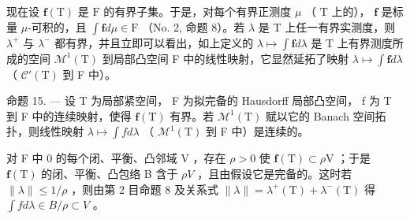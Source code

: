 现在设 \(\mathbf{f}(\mathrm{T})\) 是 \(\mathrm{F}\) 的有界子集。于是，对每个有界正测度 \(\mu\) （ \(\mathrm{T}\) 上的）， \(\mathbf{f}\) 是标量 \(\mu\)-可积的，且 \(\int \mathbf{f}d\mu \in \mathrm{F}\) （No. 2, 命题 8）。若 \(\lambda\) 是 T 上任一有界实测度，则 \(\lambda^{+}\) 与 \(\lambda^{-}\) 都有界，并且立即可以看出，如上定义的 \(\lambda \mapsto \int \mathbf{f} d\lambda\) 是 T 上有界测度所成的空间 \(\mathcal{M}^1(\mathrm{T})\) 到局部凸空间 F 中的线性映射，它显然延拓了映射 \(\lambda \mapsto \int \mathbf{f} d\lambda\) （ \(\mathcal{C}'(\mathrm{T})\) 到 F 中）。

命题 15. --- 设 T 为局部紧空间， F 为拟完备的 Hausdorff 局部凸空间， f 为 T 到 F 中的连续映射，使得 \(\mathbf{f}(\mathrm{T})\) 有界。若 \(\mathcal{M}^{1}(\mathrm{T})\) 赋以它的 Banach 空间拓扑，则线性映射 \(\lambda \mapsto \int f d\lambda\) （ \(\mathcal{M}^{1}(\mathrm{T})\) 到 F 中）是连续的。

对 F 中 0 的每个闭、平衡、凸邻域 V ，存在 \(\rho > 0\) 使 \(\mathbf{f}(\mathrm{T}) \subset \rho\mathrm{V}\) ；于是 \(\mathbf{f}(\mathrm{T})\) 的闭、平衡、凸包络 B 含于 \(\rho V\) ，且由假设它是完备的。这时若 \(\|\lambda\| \leqslant 1/\rho\) ，则由第 2 目命题 8 及关系式 \(\|\lambda\| = \lambda^{+}(\mathrm{T}) + \lambda^{-}(\mathrm{T})\) 得 \(\int f d\lambda \in B/\rho \subset V\) 。

